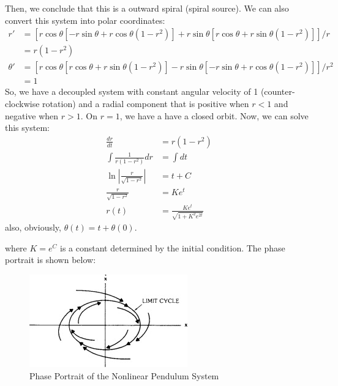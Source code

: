 \documentclass[11pt]{article}
\begin{document}
\begin{example}
    Then, we conclude that this is a outward spiral (spiral source). We can also convert this system into polar coordinates:
    \begin{align*}
        r' &= \left [ r\cos \theta [ -r\sin \theta + r\cos \theta (1 - r^2)] + r\sin \theta [r\cos \theta + r\sin \theta (1 - r^2)] \right ] / r \\
        &= r(1 - r^2) \\
        \theta' &= \left [ r\cos \theta [r\cos \theta + r\sin \theta (1 - r^2)] - r\sin \theta [-r\sin \theta + r\cos \theta (1 - r^2)] \right ] / r^2 \\
        &= 1
    \end{align*}
    So, we have a decoupled system with constant angular velocity of 1 (counter-clockwise rotation) and a radial component that is positive when \( r < 1 \) and negative when \( r > 1 \). On $r = 1$, we have a have a closed orbit. Now, we can solve this system:
    \begin{align*}
        \frac{dr}{dt} &= r(1 - r^2) \\
        \int \frac{1}{r(1 - r^2)} dr &= \int dt \\
        \ln \left | \frac{r}{\sqrt{1 - r^2}} \right | &= t + C \\
        \frac{r}{\sqrt{1 - r^2}} &= Ke^t \\
        r(t) &= \frac{Ke^t}{\sqrt{1 + K^2 e^{2t}}}
    \end{align*}
    also, obviously, \( \theta(t) = t + \theta(0) \).

    where \( K = e^C \) is a constant determined by the initial condition. The phase portrait is shown below:

    \begin{figure}[h!]
        \centering
        \includegraphics[width=\textwidth]{limitCycle.jpg}
        \caption{Phase Portrait of the Nonlinear Pendulum System}
        
    \end{figure}
\end{example}
\end{document}
